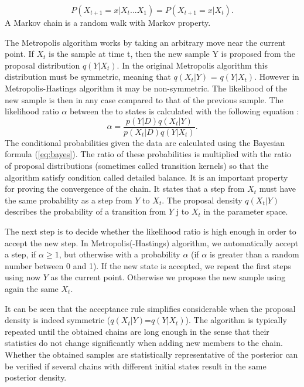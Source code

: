 \documentclass{wihuri}
\def\be{\begin{equation}}
\def\ee{\end{equation}}
\begin{document}
 \be \label{eq:markov_prop}
P(X_{t+1} = x|X_{t}. . . X_{1}) = P(X_{t+1} = x|X_{t}).
\ee
A Markov chain is a random walk with Markov property.
 
The Metropolis algorithm works by taking an arbitrary move near the current
point. If $X_{t}$ is the sample at time t, then the new sample Y is proposed from the proposal distribution $q(Y|X_{t})$. In the original Metropolis algorithm this distribution must be symmetric, meaning that $q(X_{t}|Y)$ = $q(Y|X_{t})$. However in Metropolis-Hastings algorithm it may be non-symmetric. The likelihood of the new sample is then in any case compared to that of the previous sample. The likelihood ratio $\alpha$ between the to states is calculated with the following equation \cite{tuomi}:
\be \label{eq:likely_ratio} 
\alpha = \frac{p(Y|D)q(X_{t}|Y)}{p(X_{t}|D)q(Y|X_{t})}.
\ee
The conditional probabilities given the data are calculated using the Bayesian formula (\ref{eq:bayes}). The ratio of these probabilities is multiplied with the ratio of proposal distributions (sometimes called transition kernels) so that the algorithm satisfy condition called detailed balance. It is an important property for proving the convergence of the chain. It states that a step from $X_{t}$ must have the same probability as a step from $Y$ to $X_{t}$.  The proposal density $q(X_{t}|Y)$ describes the probability of a transition from $Y$ j to $X_{t}$ in the parameter space.

The next step is to decide whether the likelihood ratio is high enough in order to accept the new step. In Metropolis(-Hastings) algorithm, we automatically accept a step, if $\alpha \ge 1$, but otherwise with a probability $\alpha$ (if $\alpha$ is greater than a random number between 0 and 1). If the new state is accepted, we repeat the first steps using now $Y$ as the current point. Otherwise we propose the new sample using again the same $X_{t}$. 



It can be seen that the acceptance rule simplifies considerable when the
proposal density is indeed symmetric ($q(X_{t}|Y)$=$q(Y|X_{t})$). The algorithm is typically repeated until the obtained chains are long enough in the sense that their statistics do not change significantly when adding new members to the chain. Whether the obtained samples are statistically representative of the posterior can be verified if several chains with different initial states result in the same posterior density.
\end{document}
